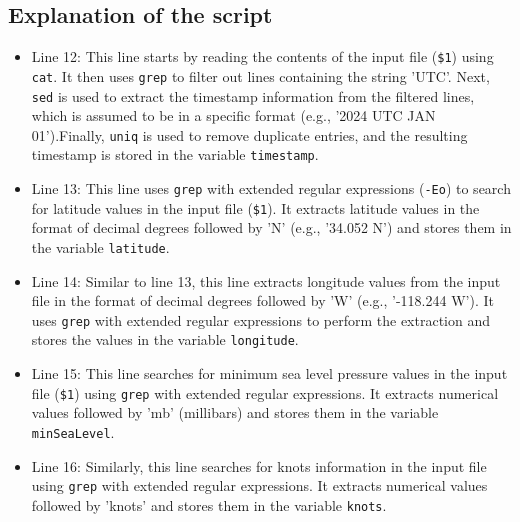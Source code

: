\documentclass[]{article}
\begin{document}
\subsection{Explanation of the script}
\vspace{2cm}
\begin{itemize}
    \item Line 12: This line starts by reading the contents of the input file (\texttt{\$1}) using \texttt{cat}. It then uses \texttt{grep} to filter out lines containing the string 'UTC'. Next, \texttt{sed} is used to extract the timestamp information from the filtered lines, which is assumed to be in a specific format (e.g., '2024 UTC JAN 01').Finally, \texttt{uniq} is used to remove duplicate entries, and the resulting timestamp is stored in the variable \texttt{timestamp}.
      
     \item Line 13: This line uses \texttt{grep} with extended regular expressions (\texttt{-Eo}) to search for latitude values in the input file (\texttt{\$1}).
        It extracts latitude values in the format of decimal degrees followed by 'N' (e.g., '34.052 N') and stores them in the variable \texttt{latitude}.

    \item Line 14: Similar to line 13, this line extracts longitude values from the input file in the format of decimal degrees followed by 'W' (e.g., '-118.244 W').
         It uses \texttt{grep} with extended regular expressions to perform the extraction and stores the values in the variable \texttt{longitude}.
  
    \item Line 15: This line searches for minimum sea level pressure values in the input file (\texttt{\$1}) using \texttt{grep} with extended regular expressions.
         It extracts numerical values followed by 'mb' (millibars) and stores them in the variable \texttt{minSeaLevel}.
    \item Line 16: Similarly, this line searches for knots information in the input file using \texttt{grep} with extended regular expressions.
        It extracts numerical values followed by 'knots' and stores them in the variable \texttt{knots}.


\end{itemize}
\end{document}
